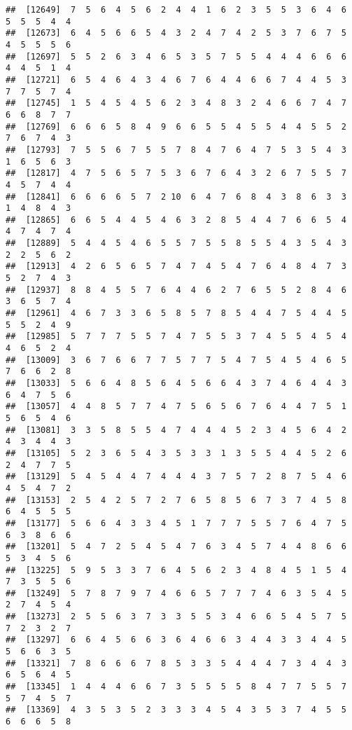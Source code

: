 \documentclass[
]{book}
\begin{document}
\begin{verbatim}
##  [12649]  7  5  6  4  5  6  2  4  4  1  6  2  3  5  5  3  6  4  6  5  5  5  4  4
##  [12673]  6  4  5  6  6  5  4  3  2  4  7  4  2  5  3  7  6  7  5  4  5  5  5  6
##  [12697]  5  5  2  6  3  4  6  5  3  5  7  5  5  4  4  4  6  6  6  4  4  5  1  4
##  [12721]  6  5  4  6  4  3  4  6  7  6  4  4  6  6  7  4  4  5  3  7  7  5  7  4
##  [12745]  1  5  4  5  4  5  6  2  3  4  8  3  2  4  6  6  7  4  7  6  6  8  7  7
##  [12769]  6  6  6  5  8  4  9  6  6  5  5  4  5  5  4  4  5  5  2  7  6  7  4  3
##  [12793]  7  5  5  6  7  5  5  7  8  4  7  6  4  7  5  3  5  4  3  1  6  5  6  3
##  [12817]  4  7  5  6  5  7  5  3  6  7  6  4  3  2  6  7  5  5  7  4  5  7  4  4
##  [12841]  6  6  6  6  5  7  2 10  6  4  7  6  8  4  3  8  6  3  3  1  4  8  4  3
##  [12865]  6  6  5  4  4  5  4  6  3  2  8  5  4  4  7  6  6  5  4  4  7  4  7  4
##  [12889]  5  4  4  5  4  6  5  5  7  5  5  8  5  5  4  3  5  4  3  2  2  5  6  2
##  [12913]  4  2  6  5  6  5  7  4  7  4  5  4  7  6  4  8  4  7  3  5  2  7  4  3
##  [12937]  8  8  4  5  5  7  6  4  4  6  2  7  6  5  5  2  8  4  6  3  6  5  7  4
##  [12961]  4  6  7  3  3  6  5  8  5  7  8  5  4  4  7  5  4  4  5  5  5  2  4  9
##  [12985]  5  7  7  7  5  5  7  4  7  5  5  3  7  4  5  5  4  5  4  4  6  5  2  4
##  [13009]  3  6  7  6  6  7  7  5  7  7  5  4  7  5  4  5  4  6  5  7  6  6  2  8
##  [13033]  5  6  6  4  8  5  6  4  5  6  6  4  3  7  4  6  4  4  3  6  4  7  5  6
##  [13057]  4  4  8  5  7  7  4  7  5  6  5  6  7  6  4  4  7  5  1  5  6  5  4  6
##  [13081]  3  3  5  8  5  5  4  7  4  4  4  5  2  3  4  5  6  4  2  4  3  4  4  3
##  [13105]  5  2  3  6  5  4  3  5  3  3  1  3  5  5  4  4  5  2  6  2  4  7  7  5
##  [13129]  5  4  5  4  4  7  4  4  4  3  7  5  7  2  8  7  5  4  6  4  5  4  7  2
##  [13153]  2  5  4  2  5  7  2  7  6  5  8  5  6  7  3  7  4  5  8  6  4  5  5  5
##  [13177]  5  6  6  4  3  3  4  5  1  7  7  7  5  5  7  6  4  7  5  6  3  8  6  6
##  [13201]  5  4  7  2  5  4  5  4  7  6  3  4  5  7  4  4  8  6  6  5  3  4  5  6
##  [13225]  5  9  5  3  3  7  6  4  5  6  2  3  4  8  4  5  1  5  4  7  3  5  5  6
##  [13249]  5  7  8  7  9  7  4  6  6  5  7  7  7  4  6  3  5  4  5  2  7  4  5  4
##  [13273]  2  5  5  6  3  7  3  3  5  5  3  4  6  6  5  4  5  7  5  7  2  3  2  7
##  [13297]  6  6  4  5  6  6  3  6  4  6  6  3  4  4  3  3  4  4  5  5  6  6  3  5
##  [13321]  7  8  6  6  6  7  8  5  3  3  5  4  4  4  7  3  4  4  3  6  5  6  4  5
##  [13345]  1  4  4  4  6  6  7  3  5  5  5  5  8  4  7  7  5  5  7  5  7  4  5  7
##  [13369]  4  3  5  3  5  2  3  3  3  4  5  4  3  5  3  7  4  5  5  6  6  6  5  8

\end{verbatim}
\end{document}
